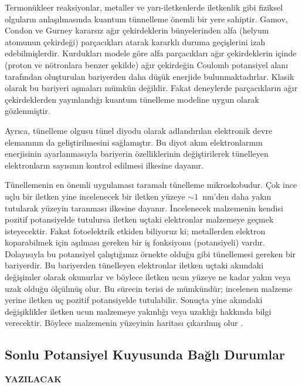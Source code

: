 \documentclass[a4paper,12pt, twoside]{article}
\newcommand{\YAZILACAK}{{\vspace{18pt}\bf\Large \color{red} YAZILACAK}}
\begin{document}
Termonükleer reaksiyonlar, metaller ve yarı-iletkenlerde iletkenlik gibi
fiziksel olguların anlaşılmasında kuantum tünnelleme önemli bir yere sahiptir. 
Gamov, Condon ve Gurney kararsız ağır çekirdeklerin bünyelerinden alfa (helyum atomunun çekirdeği) parçacıkları atarak kararklı duruma geçişlerini izah edebilmişlerdir. Kurdukları modele göre alfa parçacıkları ağır çekirdeklerin içinde (proton ve nötronlara benzer şekilde) 
ağır çekirdeğin Coulomb potansiyel alanı tarafından oluşturulan bariyerden daha düşük enerjide
bulunmaktadırlar. Klasik olarak bu bariyeri aşmaları mümkün değildir. Fakat deneylerde parçacıkların ağır çekirdeklerden yayınlandığı kuantum tünelleme modeline uygun olarak gözlenmiştir. 

Ayrıca, tünelleme olgusu tünel diyodu olarak adlandırılan elektronik devre elemanının da geliştirilmesini sağlamıştır. Bu diyot akım elektronlarının enerjisinin ayarlanmasıyla bariyerin özelliklerinin değiştirilerek tünelleyen elektronların sayısının kontrol edilmesi ilkesine dayanır.

Tünellemenin en önemli uygulaması taramalı tünelleme mikroskobudur. Çok ince uçlu bir iletken yine incelenecek bir iletken yüzeye $\sim1$~nm'den daha yakın tutularak yüzeyin taranması ilkesine dayanır. İncelenecek malzemenin kendisi pozitif potansiyelde tutulursa iletken uçtaki elektronlar malzemeye geçmek isteyecektir. Fakat fotoelektrik etkiden biliyoruz ki; metallerden elektron koparabilmek için aşılması gereken bir iş fonksiyonu (potansiyeli) vardır. Dolayısıyla bu potansiyel çalıştığımız örnekte olduğu gibi tünellemesi gereken bir bariyerdir. Bu bariyerden tünelleyen elektronlar iletken uçtaki akımdaki değişimler olarak okunurlar ve böylece iletken ucun yüzeye ne kadar yakın veya uzak olduğu ölçülmüş olur. Bu sürecin terisi de mümkündür; incelenen malzeme yerine iletken uç pozitif potansiyelde tutulabilir. Sonuçta yine akımdaki değişiklikler iletken ucun malzemeye yakınlığı veya uzaklığı hakkında bilgi verecektir. Böylece malzemenin yüzeyinin haritası çıkarılmış olur \cite{book:Ficek}.


\subsection{Sonlu Potansiyel Kuyusunda Bağlı Durumlar}
\YAZILACAK

\newpage
\renewcommand\refname{Kaynaklar}
{}
 
\end{document}
